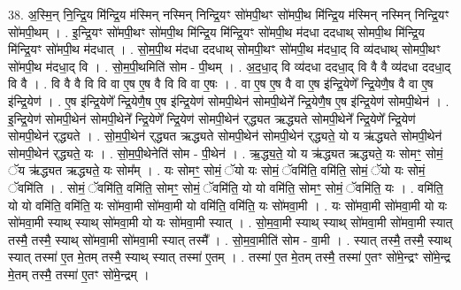 \documentclass[17pt]{extarticle}
\begin{document}
38. अ॒स्मि॒न् नि॒न्द्रि॒य मि॑न्द्रि॒य म॑स्मिन् नस्मिन् निन्द्रि॒यꣳ सो॑मपी॒थꣳ सो॑मपी॒थ मि॑न्द्रि॒य म॑स्मिन् नस्मिन् निन्द्रि॒यꣳ सो॑मपी॒थम् । . इ॒न्द्रि॒यꣳ सो॑मपी॒थꣳ सो॑मपी॒थ मि॑न्द्रि॒य मि॑न्द्रि॒यꣳ सो॑मपी॒थ म॑दधा ददधाथ् सोमपी॒थ मि॑न्द्रि॒य मि॑न्द्रि॒यꣳ सो॑मपी॒थ म॑दधात् । . सो॒म॒पी॒थ म॑दधा ददधाथ् सोमपी॒थꣳ सो॑मपी॒थ म॑दधा॒द् वि व्य॑दधाथ् सोमपी॒थꣳ सो॑मपी॒थ म॑दधा॒द् वि । . सो॒म॒पी॒थमिति॑ सोम - पी॒थम् । . अ॒द॒धा॒द् वि व्य॑दधा ददधा॒द् वि वै वै व्य॑दधा ददधा॒द् वि वै । . वि वै वै वि वि वा ए॒ष ए॒ष वै वि वि वा ए॒षः । . वा ए॒ष ए॒ष वै वा ए॒ष इ॑न्द्रि॒येणे᳚ न्द्रि॒येणै॒ष वै वा ए॒ष इ॑न्द्रि॒येण॑ । . ए॒ष इ॑न्द्रि॒येणे᳚ न्द्रि॒येणै॒ष ए॒ष इ॑न्द्रि॒येण॑ सोमपी॒थेन॑ सोमपी॒थेने᳚ न्द्रि॒येणै॒ष ए॒ष इ॑न्द्रि॒येण॑ सोमपी॒थेन॑ । . इ॒न्द्रि॒येण॑ सोमपी॒थेन॑ सोमपी॒थेने᳚ न्द्रि॒येणे᳚ न्द्रि॒येण॑ सोमपी॒थेन॑ र्‌द्ध्यत ऋद्ध्यते सोमपी॒थेने᳚ न्द्रि॒येणे᳚ न्द्रि॒येण॑ सोमपी॒थेन॑ र्‌द्ध्यते । . सो॒म॒पी॒थेन॑ र्‌द्ध्यत ऋद्ध्यते सोमपी॒थेन॑ सोमपी॒थेन॑ र्‌द्ध्यते॒ यो य ऋ॑द्ध्यते सोमपी॒थेन॑ सोमपी॒थेन॑ र्‌द्ध्यते॒ यः । . सो॒म॒पी॒थेनेति॑ सोम - पी॒थेन॑ । . ऋ॒द्ध्य॒ते॒ यो य ऋ॑द्ध्यत ऋद्ध्यते॒ यः सोमꣳ॒॒ सोमं॒ ॅय ऋ॑द्ध्यत ऋद्ध्यते॒ यः सोम᳚म् । . यः सोमꣳ॒॒ सोमं॒ ॅयो यः सोमं॒ ॅवमि॑ति॒ वमि॑ति॒ सोमं॒ ॅयो यः सोमं॒ ॅवमि॑ति । . सोमं॒ ॅवमि॑ति॒ वमि॑ति॒ सोमꣳ॒॒ सोमं॒ ॅवमि॑ति॒ यो यो वमि॑ति॒ सोमꣳ॒॒ सोमं॒ ॅवमि॑ति॒ यः । . वमि॑ति॒ यो यो वमि॑ति॒ वमि॑ति॒ यः सो॑मवा॒मी सो॑मवा॒मी यो वमि॑ति॒ वमि॑ति॒ यः सो॑मवा॒मी । . यः सो॑मवा॒मी सो॑मवा॒मी यो यः सो॑मवा॒मी स्याथ् स्याथ् सो॑मवा॒मी यो यः सो॑मवा॒मी स्यात् । . सो॒म॒वा॒मी स्याथ् स्याथ् सो॑मवा॒मी सो॑मवा॒मी स्यात् तस्मै॒ तस्मै॒ स्याथ् सो॑मवा॒मी सो॑मवा॒मी स्यात् तस्मै᳚ । . सो॒म॒वा॒मीति॑ सोम - वा॒मी । . स्यात् तस्मै॒ तस्मै॒ स्याथ् स्यात् तस्मा॑ ए॒त मे॒तम् तस्मै॒ स्याथ् स्यात् तस्मा॑ ए॒तम् । . तस्मा॑ ए॒त मे॒तम् तस्मै॒ तस्मा॑ ए॒तꣳ सो॑मे॒न्द्रꣳ सो॑मे॒न्द्र मे॒तम् तस्मै॒ तस्मा॑ ए॒तꣳ सो॑मे॒न्द्रम् । \newline
\pagebreak
{}
\end{document}
